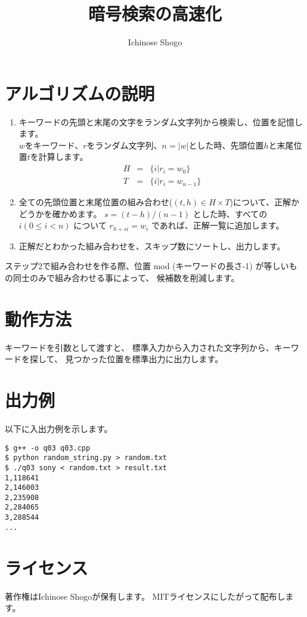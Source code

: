 \documentclass{jsarticle}
\title{暗号検索の高速化}
\author{Ichinose Shogo}
\begin{document}
\maketitle

\section{アルゴリズムの説明}

\begin{enumerate}
\item キーワードの先頭と末尾の文字をランダム文字列から検索し、位置を記憶します。\\
	$w$をキーワード、$r$をランダム文字列、$n=|w|$とした時、先頭位置$h$と末尾位置$t$を計算します。
	\begin{eqnarray*}
		H &=& \{ i | r_i = w_0 \} \\
		T &=& \{ i | r_i = w_{n-1} \}
	\end{eqnarray*}
\item 全ての先頭位置と末尾位置の組み合わせ($(t,h) \in H \times T$)について、正解かどうかを確かめます。
	$s = (t-h) / (n-1)$ とした時、すべての$i(0 \le i < n)$ について $r_{h+si} = w_i$ であれば、正解一覧に追加します。
\item 正解だとわかった組み合わせを、スキップ数にソートし、出力します。
\end{enumerate}
ステップ2で組み合わせを作る際、位置 mod (キーワードの長さ-1) が等しいもの同士のみで組み合わせる事によって、
候補数を削減します。

\section{動作方法}
キーワードを引数として渡すと、
標準入力から入力された文字列から、キーワードを探して、
見つかった位置を標準出力に出力します。

\section{出力例}
以下に入出力例を示します。
\begin{verbatim}
$ g++ -o q03 q03.cpp
$ python random_string.py > random.txt
$ ./q03 sony < random.txt > result.txt
1,118641
2,146003
2,235908
2,284065
3,288544
...
\end{verbatim}

\section{ライセンス}
著作権はIchinose Shogoが保有します。
MITライセンスにしたがって配布します。
\end{document}
